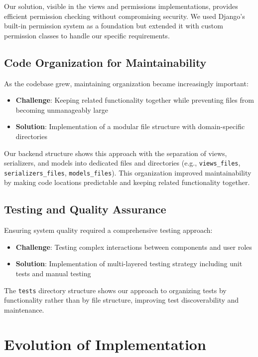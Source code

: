Our solution, visible in the views and permissions implementations, provides efficient 
permission checking without compromising security. We used Django's built-in permission 
system as a foundation but extended it with custom permission classes to handle our 
specific requirements.

\subsection{Code Organization for Maintainability}

As the codebase grew, maintaining organization became increasingly important:

\begin{itemize}
    \item \textbf{Challenge}: Keeping related functionality together while preventing 
    files from becoming unmanageably large
    \item \textbf{Solution}: Implementation of a modular file structure with 
    domain-specific directories
\end{itemize}

Our backend structure shows this approach with the separation of views, serializers, 
and models into dedicated files and directories (e.g., \texttt{views\_files}, 
\texttt{serializers\_files}, \texttt{models\_files}). This organization improved 
maintainability by making code locations predictable and keeping related functionality 
together.

\subsection{Testing and Quality Assurance}

Ensuring system quality required a comprehensive testing approach:

\begin{itemize}
    \item \textbf{Challenge}: Testing complex interactions between components and user 
    roles
    \item \textbf{Solution}: Implementation of multi-layered testing strategy including 
    unit tests and manual testing
\end{itemize}

The \texttt{tests} directory structure shows our approach to organizing tests by 
functionality rather than by file structure, improving test discoverability and 
maintenance.

\section{Evolution of Implementation}

